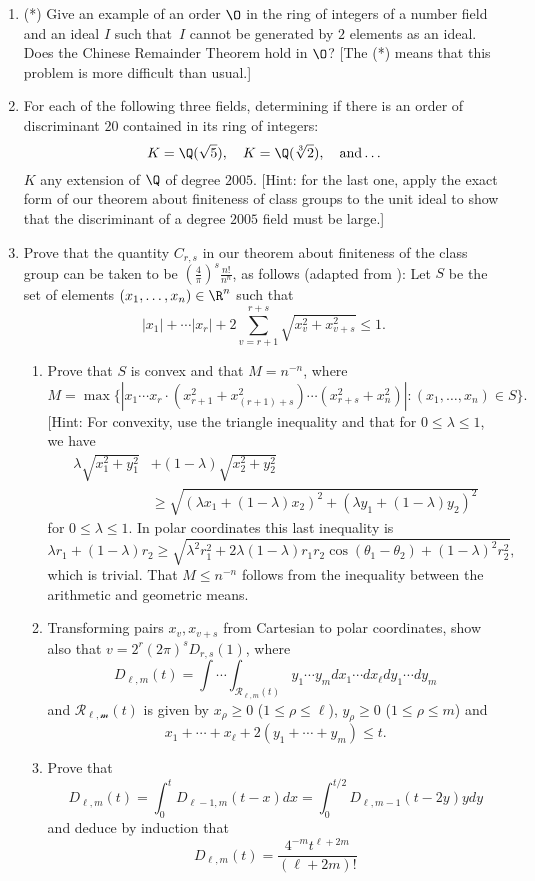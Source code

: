 \begin{enumerate}
\item (*) Give an example of an order $\O$ in the ring of integers of
  a number field and an ideal $I$ such that~$I$ cannot be generated by
  $2$ elements as an ideal.  Does the Chinese Remainder Theorem hold
  in $\O$?  [The (*) means that this problem is more difficult than
  usual.]


\item For each of the following three fields, determining if there is
  an order of discriminant $20$ contained in its ring of integers:
$$
  K = \Q(\sqrt{5}), \quad K=\Q(\sqrt[3]{2}), \quad\text{and}\ldots
$$
$K$ any extension of $\Q$ of degree $2005$.  [Hint: for the last one,
apply the exact form of our theorem about finiteness of class groups
to the unit ideal to show that the discriminant of a degree $2005$
field must be large.]

\item Prove that the quantity $C_{r,s}$ in our theorem about finiteness
of the class group can be taken to be $\left(\frac{4}{\pi}\right)^{s} \frac{n!}{n^n}$, as follows (adapted from \cite[pg.~19]{sd:brief}):
Let $S$ be the set of elements
$(x_1,\ldots, x_{n})\in\R^n$ such that
$$
  |x_1| + \cdots |x_{r}| + 2 \sum_{v=r+1}^{r+s}
                    \sqrt{x_v^2 + x_{v+s}^2} \leq 1.
$$
\begin{enumerate}
\item 
Prove that $S$ is convex and that $M=n^{-n}$,
where 
$$
  M = \max\{ |x_1\cdots x_r\cdot (x_{r+1}^2 + x_{(r+1)+s}^2)\cdots (x_{r+s}^2 + x_n^2)| : (x_1,\ldots, x_n) \in S\}.
$$
[Hint: For convexity, use the triangle inequality and
that for $0\leq \lambda \leq 1$, we have
\begin{align*}
\lambda\sqrt{x_1^2 + y_1^2} &+ (1-\lambda)\sqrt{x_2^2+y_2^2}\\
&\geq\sqrt{(\lambda x_1 + (1-\lambda)x_2)^2 + 
(\lambda y_1 + (1-\lambda)y_2)^2}
\end{align*}
for $0\leq \lambda \leq 1$.  In polar coordinates this last inequality
is 
$$
  \lambda r_1 + (1-\lambda)r_2 \geq 
   \sqrt{\lambda^2 r_1^2 + 2\lambda(1-\lambda) r_1 r_2 \cos(\theta_1 - \theta_2) + (1-\lambda)^2 r_2^2},
$$
which is trivial.  That $M\leq n^{-n}$ follows from the inequality
between the arithmetic and geometric means.
\item Transforming pairs $x_v, x_{v+s}$ from Cartesian to polar coordinates,
show also that $v=2^{r}(2\pi)^s D_{r,s}(1)$, where
$$
  D_{\ell,m}(t) = \int \cdots \int_{\mathcal{R}_{\ell,m}(t)}
       y_1 \cdots y_m dx_1 \cdots dx_{\ell} dy_1 \cdots dy_m
$$
and 
$\mathcal{R_{\ell,m}}(t)$ is given by $x_{\rho}\geq 0$
($1\leq \rho\leq \ell$), $y_{\rho}\geq 0$
($1\leq \rho\leq m$) and 
$$
  x_1 + \cdots + x_{\ell} + 2(y_1+\cdots +y_m) \leq t.
$$
\item Prove that
$$
  D_{\ell,m}(t) = \int_{0}^t D_{\ell-1,m}(t-x)dx
     =\int_{0}^{t/2} D_{\ell,m-1}(t-2y)y dy
$$
and deduce by induction that 
$$
  D_{\ell,m}(t) = \frac{4^{-m}t^{\ell+2m}}{(\ell+2m)!}
$$
\end{enumerate}



\end{enumerate}
